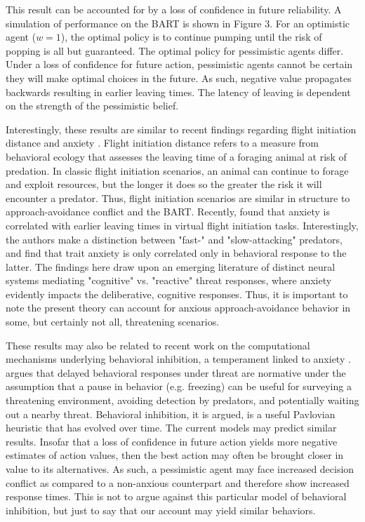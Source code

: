 \documentclass[11pt]{article} %
\begin{document}
This result can be accounted for by a loss of confidence in future reliability. A simulation of performance on the BART is shown in Figure 3. For an optimistic agent ($w=1$), the optimal policy is to continue pumping until the risk of popping is all but guaranteed. The optimal policy for pessimistic agents differ. Under a loss of confidence for future action, pessimistic agents cannot be certain they will make optimal choices in the future. As such, negative value propagates backwards resulting in earlier leaving times. The latency of leaving is dependent on the strength of the pessimistic belief.

Interestingly, these results are similar to recent findings regarding flight initiation distance and anxiety \citep{Mobbs2018, Mobbs2019}. Flight initiation distance refers to a measure from behavioral ecology that assesses the leaving time of a foraging animal at risk of predation. In classic flight initiation scenarios, an animal can continue to forage and exploit resources, but the longer it does so the greater the risk it will encounter a predator. Thus, flight initiation scenarios are similar in structure to approach-avoidance conflict and the BART. Recently, \cite{Mobbs2019} found that anxiety is correlated with earlier leaving times in virtual flight initiation tasks. Interestingly, the authors make a distinction between "fast-" and "slow-attacking" predators, and find that trait anxiety is only correlated only in behavioral response to the latter. The findings here draw upon an emerging literature of distinct neural systems mediating "cognitive" vs. "reactive" threat responses, where anxiety evidently impacts the deliberative, cognitive responses. Thus, it is important to note the present theory can account for anxious approach-avoidance behavior in some, but certainly not all, threatening scenarios.

These results may also be related to recent work on the computational mechanisms underlying behavioral inhibition, a temperament linked to anxiety \citep{bach2015, khemka2017}. \cite{bach2015} argues that delayed behavioral responses under threat are normative under the assumption that a pause in behavior (e.g. freezing) can be useful for surveying a threatening environment, avoiding detection by predators, and potentially waiting out a nearby threat. Behavioral inhibition, it is argued, is a useful Pavlovian heuristic that has evolved over time. The current models may predict similar results. Insofar that a loss of confidence in future action yields more negative estimates of action values, then the best action may often be brought closer in value to its alternatives. As such, a pessimistic agent may face increased decision conflict as compared to a non-anxious counterpart and therefore show increased response times. This is not to argue against this particular model of behavioral inhibition, but just to say that our account may yield similar behaviors.
\end{document}
